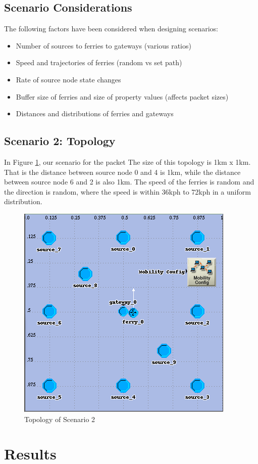 \subsection{Scenario Considerations}

The following factors have been considered when designing scenarios:
\begin{itemize}
\item Number of sources to ferries to gateways (various ratios)
\item Speed and trajectories of ferries (random vs set path)
\item Rate of source node state changes
\item Buffer size of ferries and size of property values (affects packet sizes)
\item Distances and distributions of ferries and gateways
\end{itemize}

\subsection{Scenario 2: Topology}

In Figure \ref{fig:scenario2}, our scenario for the packet The size of this topology is 1km x 1km.  
That is the distance between source node 0 and 4 is 1km, while the distance between source node 6 and 2 is also 1km.  
The speed of the ferries is random and the direction is random, where the speed is within 36kph to 72kph in a uniform distribution.  

\begin{figure}[h]
    \centering
    \includegraphics[width=.5\textwidth]{images/scenario2-top}
    \caption{Topology of Scenario 2}
    \label{fig:scenario2}
\end{figure}


\section{Results}

